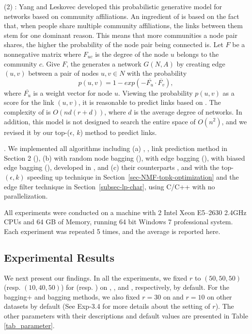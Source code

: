 \sstab  (2) \CAMBN \cite{yang-wsdm2013}:
  Yang and Leskovec developed this probabilistic generative model for networks
  based on community affiliations. An ingredient of \BIGCLAM is based on the fact that,
  when people share multiple community affiliations, the links between them stem for
  one dominant reason. This means that more communities a node pair shares,
  the higher the probability of the  node pair being connected is.
  Let $F$ be a nonnegative matrix where $F_{uc}$ is the degree of the node $u$ belongs to
  the community $c$. Give $F$, the \BIGCLAM generates a network $G(N, A)$ by creating edge
  $(u, v)$ between a pair of nodes $u, v \in N$ with the probability
    \[ p(u, v) = 1 - exp(-\overline{F_u}\cdot \overline{F_v}), \]
where $\overline{F_u}$ is a weight vector for node $u$. Viewing the probability $p(u, v)$ as
  a score for the link $(u, v)$, it is reasonable to predict links based on \BIGCLAM.
The complexity of  \BIGCLAM is $O(nd(r + d) )$, where $d$ is the average degree of networks.
  In addition, this model is not designed to search the entire space of $O( n^2 )$,
  and we revised it by our top-($\epsilon$, $k$) method to predict links.


.
We implemented all algorithms including (a) \Aa, \BIGCLAM,
link prediction method in Section 2 (\NMF),
(b) \NMF with random node bagging (\Node), \NMF with  edge bagging (\Edge),
\NMF with biased edge bagging (\Biased), developed in \cite{liang2016}, and (c) their counterparts \Nodep, \Edgep and \Biasedp with the top-$(\epsilon, k)$ speeding up technique in Section~\ref{sec-NMF-topk-optimization} and the edge filter technique in Section~\ref{subsec-lp-char}, using C/C++ with no parallelization.




All experiments were conducted on a machine with 2 Intel Xeon
E5--2630 2.4GHz CPUs and 64 GB of Memory, running 64 bit
Windows 7 professional system. Each experiment was repeated 5 times,
and the average is reported here.

\subsection{Experimental Results}


We next present our findings. In all the experiments, we fixed $r$ to
$(50, 50, 50)$ (resp. $(10, 40, 50)$) for \NMF (resp. \BIGCLAM) on
\Digg, \YouTube, and \Wikipedia, respectively, by default. For the bagging+ and bagging
methods, we also fixed $r = 30$ on \Digg and $r = 10$ on other datasets by default
(See Exp-3.4 for more details about the setting of $r$).
The other parameters with their descriptions and default values
are presented in Table \ref{tab_parameter}.

